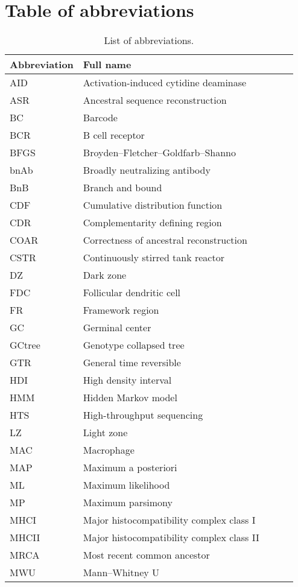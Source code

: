 \chapter{Table of abbreviations}

\begin{table}[!ht]
\begin{tabular}{l*{3}{l}r}
	 \textbf{Abbreviation} & \textbf{Full name} \\
	\hline
	AID & Activation-induced cytidine deaminase \\
	ASR & Ancestral sequence reconstruction \\
	BC & Barcode \\
	BCR & B cell receptor \\
	BFGS & Broyden–Fletcher–Goldfarb–Shanno \\
	bnAb & Broadly neutralizing antibody \\
	BnB & Branch and bound \\
	CDF & Cumulative distribution function \\
	CDR & Complementarity defining region \\
	COAR & Correctness of ancestral reconstruction \\
	CSTR & Continuously stirred tank reactor \\
	DZ & Dark zone \\
	FDC & Follicular dendritic cell \\
	FR & Framework region \\
	GC & Germinal center \\
	GCtree & Genotype collapsed tree \\
	GTR & General time reversible \\
	HDI & High density interval \\
	HMM & Hidden Markov model \\
	HTS & High-throughput sequencing \\
    LZ & Light zone \\
	MAC & Macrophage \\
	MAP & Maximum a posteriori \\
	ML & Maximum likelihood \\
	MP & Maximum parsimony \\
	MHCI & Major histocompatibility complex class I \\
	MHCII & Major histocompatibility complex class II \\
	MRCA & Most recent common ancestor \\
	MWU & Mann–Whitney U \\
	\hline
\end{tabular}
\caption{List of abbreviations.}
\end{table}

